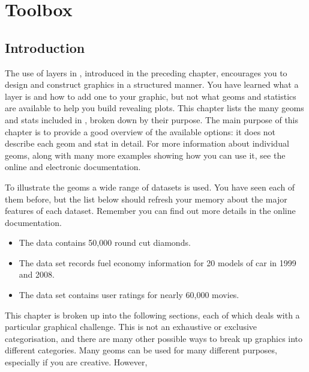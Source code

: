 

% 


\chapter{Toolbox}
\label{cha:toolbox}

\section{Introduction}

The use of layers in \ggplot, introduced in the preceding chapter, encourages you to design and construct graphics in a structured manner.  You have learned what a layer is and how to add one to your graphic, but not what geoms and statistics are available to help you build revealing plots.  This chapter lists the many geoms and stats included in \ggplot, broken down by their purpose.  The main purpose of this chapter is to provide a good overview of the available options: it does not describe each geom and stat in detail.  For more information about individual geoms, along with many more examples showing how you can use it, see the online and electronic documentation.

To illustrate the geoms a wide range of datasets is used.  You have seen each of them before, but the list below should refresh your memory about the major features of each dataset.  Remember you can find out more details in the online documentation.

\begin{itemize}
  \item The  data contains 50,000 round cut diamonds.

  \item The  data set records fuel economy information for 20 models of car in 1999 and 2008.

  \item The  data set contains user ratings for nearly 60,000 movies.
\end{itemize}

This chapter is broken up into the following sections, each of which deals with a particular graphical challenge.  This is not an exhaustive or exclusive categorisation, and there are many other possible ways to break up graphics into different categories.  Many geoms can be used for many different purposes, especially if you are creative.  However, 

